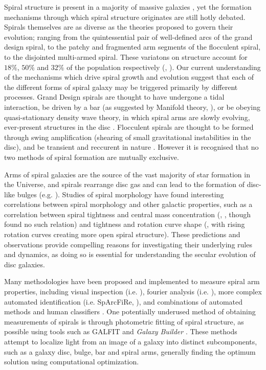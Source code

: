 

Spiral structure is present in a majority of massive galaxies \citep{2008MNRAS.389.1179L}, yet the formation mechanisms through which spiral structure originates are still hotly debated. Spirals themselves are as diverse as the theories proposed to govern their evolution; ranging from the quintessential pair of well-defined arcs of the grand design spiral, to the patchy and fragmented arm segments of the flocculent spiral, to the disjointed multi-armed spiral. These variatons on structure account for $18\%$, $50\%$ and $32\%$ of the population respectively (\citealt{2011ApJ...737...32E}, \citealt{2015yCat..22170032B}). Our current understanding of the mechanisms which drive spiral growth and evolution suggest that each of the different forms of spiral galaxy may be triggered primarily by different processes. Grand Design spirals are thought to have undergone a tidal interaction, be driven by a bar (as suggested by Manifold theory, \citealt{2011hsa6.conf..548R}), or be obeying quasi-stationary density wave theory, in which spiral arms are slowly evolving, ever-present structures in the disc \citep{1964ApJ...140..646L}. Flocculent spirals are thought to be formed through swing amplification (shearing of small gravitational instabilities in the disc), and be transient and reccurent in nature \citep{1966ApJ...146..810J}. However it is recognised that no two methods of spiral formation are mutually exclusive.

Arms of spiral galaxies are the source of the vast majority of star formation in the Universe, and spirals rearrange disc gas and can lead to the formation of disc-like bulges (e.g. \citealt{2004ARA&A..42..603K}). Studies of spiral morphology have found interesting correlations between spiral morphology and other galactic properties, such as a correlation between spiral tightness and central mass concentration (\citealt{2019ApJ...871..194Y}, \citealt{2015PhDT........14D}, though \citealt{2017MNRAS.472.2263H} found no such relation) and tightness and rotation curve shape (\citealt{2005MNRAS.359.1065S}, with rising rotation curves creating more open spiral structure). These predictions and observations provide compelling reasons for investigating their underlying rules and dynamics, as doing so is essential for understanding the secular evolution of disc galaxies.

Many methodologies have been proposed and implemented to measure spiral arm properties, including visual inspection (i.e. \citealt{2015A&A...582A..86H}), fourier analysis (i.e. \citealt{2019arXiv190804246D}), more complex automated identification (i.e. SpArcFiRe, \citealt{2014ApJ...790...87D}), and combinations of automated methods and human classifiers \citep{2017MNRAS.472.2263H}. One potentially underused method of obtaining measurements of spirals is through photometric fitting of spiral structure, as possible using tools such as \textsc{GALFIT} \citep{2010AJ....139.2097P} and \textit{Galaxy Builder} . These methods attempt to localize light from an image of a galaxy into distinct subcomponents, such as a galaxy disc, bulge, bar and spiral arms, generally finding the optimum solution using computational optimization.

